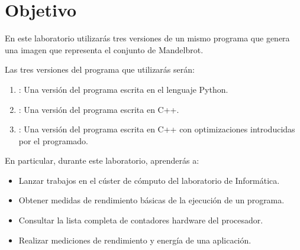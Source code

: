 \section{Objetivo}

En este laboratorio utilizarás tres versiones de un mismo programa
que genera una imagen que representa el conjunto de Mandelbrot.

Las tres versiones del programa que utilizarás serán:

\begin{enumerate}
  \item {}: Una versión del programa escrita en el lenguaje Python.
  \item {}: Una versión del programa escrita en C++.
  \item {}: Una versión del programa escrita en C++
        con optimizaciones introducidas por el programado.
\end{enumerate}

En particular, durante este laboratorio, aprenderás a:


\begin{itemize}

  \item Lanzar trabajos en el cúster de cómputo del laboratorio de Informática.
  \item Obtener medidas de rendimiento básicas de la ejecución de un programa.
  \item Consultar la lista completa de contadores hardware del procesador.
  \item Realizar mediciones de rendimiento y energía de una aplicación.
\end{itemize}
